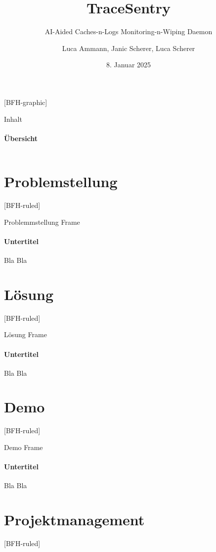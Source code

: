 \documentclass[
	ngerman,%
	authorontitle=true,
	]{bfhbeamer}
\title{TraceSentry}
\subtitle{AI-Aided Caches-n-Logs Monitoring-n-Wiping Daemon}
\author[L. Ammann, J. Scherer, L. Scherer]{Luca Ammann, Janic Scherer, Luca Scherer}
\date{8. Januar 2025}
\institute{BFH-TI}
\begin{document}
[BFH-graphic]
\maketitle

\begin{frame}{Inhalt}
	\framesubtitle{Übersicht}
	\begin{columns}
		\begin{column}{0.4\textwidth}
			\tableofcontents
		\end{column}
		\begin{column}{0.6\textwidth}
			\begin{center}
			\end{center}
		\end{column}
	\end{columns}
\end{frame}


\section{Problemstellung}\label{sec:problemstellung}
[BFH-ruled]
\frame{\sectionpage}

\begin{frame}{Problemmstellung Frame}
	\framesubtitle{Untertitel}
	Bla Bla
\end{frame}


\section{Lösung}\label{sec:loesung}
[BFH-ruled]
\frame{\sectionpage}

\begin{frame}{Lösung Frame}
	\framesubtitle{Untertitel}
	Bla Bla
\end{frame}

\section{Demo}\label{sec:demo}
[BFH-ruled]
\frame{\sectionpage}

\begin{frame}{Demo Frame}
	\framesubtitle{Untertitel}
	Bla Bla
\end{frame}

\section{Projektmanagement}\label{sec:projektmanagement}
[BFH-ruled]
\frame{\sectionpage}
\end{document}
